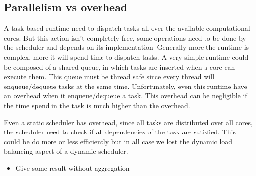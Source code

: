 \subsection{Parallelism vs overhead}
A task-based runtime need to dispatch tasks all over the available computational cores.
%
But this action isn't completely free, some operations need to be done by the scheduler and depends on its implementation.
%
Generally more the runtime is complex, more it will spend time to dispatch tasks.
%
A very simple runtime could be composed of a shared queue, in which tasks are inserted when a core can execute them.
%
This queue must be thread safe since every thread will enqueue/dequeue tasks at the same time.
%
Unfortunately, even this runtime have an overhead when it enqueue/dequeue a task.
%
This overhead can be negligible if the time spend in the task is much higher than the overhead.


Even a static scheduler has overhead, since all tasks are distributed over all cores, the scheduler need to check if all dependencies of the task are satisfied.
%
This could be do more or less efficiently but in all case we lost the dynamic load balancing aspect of a dynamic scheduler.


  \begin{itemize}
    \item Give some result without aggregation
  \end{itemize}
